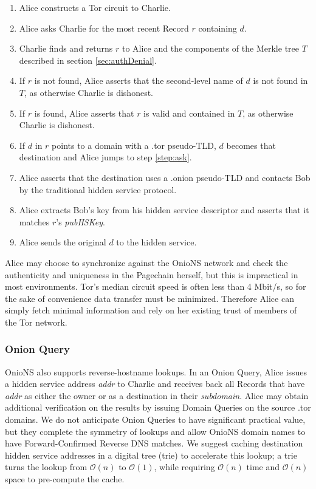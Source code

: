 \documentclass[USenglish,oneside,twocolumn]{article}
\begin{document}
\begin{enumerate}
	\item Alice constructs a Tor circuit to Charlie.
	\item \label{step:ask} Alice asks Charlie for the most recent Record $ r $ containing $ d $.
	\item Charlie finds and returns $ r $ to Alice and the components of the Merkle tree $ T $ described in section \ref{sec:authDenial}.
	\item If $ r $ is not found, Alice asserts that the second-level name of $ d $ is not found in $ T $, as otherwise Charlie is dishonest.
	\item If $ r $ is found, Alice asserts that $ r $ is valid and contained in $ T $, as otherwise Charlie is dishonest.
	\item If $ d $ in $ r $ points to a domain with a .tor pseudo-TLD, $ d $ becomes that destination and Alice jumps to step \ref{step:ask}.
	\item Alice asserts that the destination uses a .onion pseudo-TLD and contacts Bob by the traditional hidden service protocol.
	\item Alice extracts Bob's key from his hidden service descriptor and asserts that it matches $ r $'s \emph{pubHSKey}.
	\item Alice sends the original $ d $ to the hidden service.
\end{enumerate}

Alice may choose to synchronize against the OnioNS network and check the authenticity and uniqueness in the Pagechain herself, but this is impractical in most environments. Tor's median circuit speed is often less than 4 Mbit/s, \cite{TorMetrics} so for the sake of convenience data transfer must be minimized. Therefore Alice can simply fetch minimal information and rely on her existing trust of members of the Tor network.

\subsubsection{Onion Query} %

OnioNS also supports reverse-hostname lookups. In an Onion Query, Alice issues a hidden service address \emph{addr} to Charlie and receives back all Records that have \emph{addr} as either the owner or as a destination in their \emph{subdomain}. Alice may obtain additional verification on the results by issuing Domain Queries on the source .tor domains. We do not anticipate Onion Queries to have significant practical value, but they complete the symmetry of lookups and allow OnioNS domain names to have Forward-Confirmed Reverse DNS matches. We suggest caching destination hidden service addresses in a digital tree (trie) to accelerate this lookup; a trie turns the lookup from $ \mathcal{O}(n) $ to $ \mathcal{O}(1) $, while requiring $ \mathcal{O}(n) $ time and $ \mathcal{O}(n) $ space to pre-compute the cache.
\end{document}
